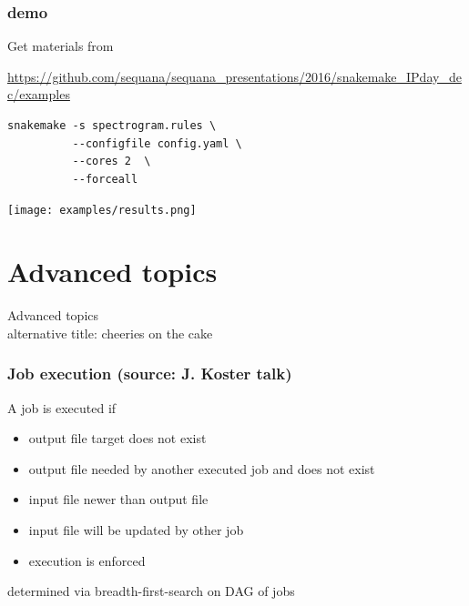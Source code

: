 \documentclass{beamer}
\begin{document}

\begin{frame}[fragile]
\frametitle{demo}
Get materials from  

\url{https://github.com/sequana/sequana_presentations/2016/snakemake_IPday_dec/examples}
\begin{block}{}
    \begin{lstlisting}[basicstyle=\large]
snakemake -s spectrogram.rules \
          --configfile config.yaml \
          --cores 2  \
          --forceall
\end{lstlisting}
\end{block}
\end{frame}


\begin{frame}
\begin{block}{}
 \texttt{[image: examples/results.png]}
\end{block}
\end{frame}




\section{Advanced topics}
\begin{frame}[plain]
 \centering
 \begin{Huge}
Advanced topics 
\\
\large{alternative title: cheeries on the cake}
\end{Huge}
\end{frame}


\begin{frame}
\frametitle{Job execution \tiny{(source: J. Koster talk)}}
 A job is executed if
 \begin{itemize}
 \item  output file target does not exist
 \item  output file needed by another executed job and does not exist
 \item  input file newer than output file
 \item  input file will be updated by other job
 \item  execution is enforced
\end{itemize}
determined via breadth-first-search on DAG of jobs 
\end{frame}
\end{document}
